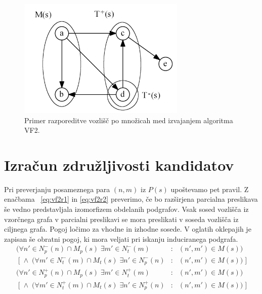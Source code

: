 \documentclass[a4paper, 12pt, ]{book}
\begin{document}
	\begin{figure}
	\begin{center}
	\includegraphics[width=8cm]{img/graph_t_in_out.png}
	\end{center}
	\caption{Primer razporeditve vozlišč po množicah med izvajanjem algoritma VF2.}
	\label{pic_t_in_out}
	\end{figure}



	\section{Izračun združljivosti kandidatov}
	\label{vf2:feasible}

	Pri preverjanju posameznega para $(n,m)$ iz $P(s)$ upoštevamo pet pravil. Z ena\-čbama ~\ref{eq:vf2r1} in \ref{eq:vf2r2} preverimo, če bo razširjena
	parcialna preslikava še vedno predstavljala izomorfizem obdelanih podgrafov. Vsak sosed vozlišča iz vzorčnega grafa v parcialni preslikavi se mora
	preslikati v soseda vozlišča iz ciljnega grafa. Pogoj ločimo za vhodne in izhodne sosede. V oglatih oklepajih je zapisan
	še obratni pogoj, ki mora veljati pri iskanju induciranega podgrafa.
	\begin{equation}
	\label{eq:vf2r1}
	\begin{array}{rcl}
	(\forall n' \in N_p^-(n) \cap M_p(s) \; \exists m' \in N_t^-(m)    \!\!\!&:&\!\!	 (n', m') \in M(s)) \\
	\;[\; \wedge \; (\forall m' \in N_t^-(m) \cap M_t(s)\; \exists n' \in N_p^-(n) \!\!\!&:&\!\! (n', m') \in M(s)) \;]
	\end{array}
	\end{equation}
	\begin{equation}
	\label{eq:vf2r2}
	\begin{array}{rcl}
	(\forall n' \in N_p^+(n)  \cap M_p(s)  \; \exists m' \in N_t^+(m)    \!\!\!&:&\!\!	 (n', m') \in M(s)) \\
	\;[\; \wedge \; (\forall m' \in N_t^+(m) \cap  M_t(s)\; \exists n' \in N_p^+(n)     \!\!\!&:&\!\!	 (n', m') \in M(s)) \;]
	\end{array}
	\end{equation}
	
\end{document}

